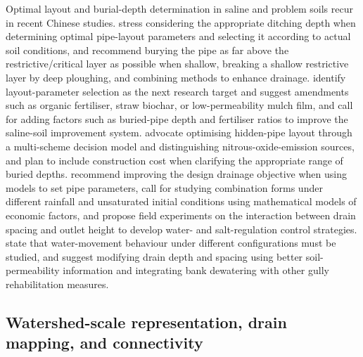 \documentclass[11pt]{article}
\begin{document}
Optimal layout and burial-depth determination in saline and problem soils
recur in recent Chinese studies. \textcite{Tian2023} stress considering the
appropriate ditching depth when determining optimal pipe-layout parameters and
selecting it according to actual soil conditions, and \textcite{Tian2024}
recommend burying the pipe as far above the restrictive/critical layer as
possible when shallow, breaking a shallow restrictive layer by deep ploughing,
and combining methods to enhance drainage. \textcite{Tian2023c} identify
layout-parameter selection as the next research target and suggest amendments
such as organic fertiliser, straw biochar, or low-permeability mulch film, and
\textcite{Zhang2024d} call for adding factors such as buried-pipe depth and
fertiliser ratios to improve the saline-soil improvement system.
\textcite{Zhai2023} advocate optimising hidden-pipe layout through a
multi-scheme decision model and distinguishing nitrous-oxide-emission sources,
and \textcite{Han2023} plan to include construction cost when clarifying the
appropriate range of buried depths. \textcite{Qian2025b} recommend improving
the design drainage objective when using models to set pipe parameters,
\textcite{Ren2021} call for studying combination forms under different rainfall
and unsaturated initial conditions using mathematical models of economic
factors, and \textcite{Zheng2025} propose field experiments on the interaction
between drain spacing and outlet height to develop water- and salt-regulation
control strategies. \textcite{SerranoCoronel2018} state that water-movement
behaviour under different configurations must be studied, and
\textcite{Zegeye2021} suggest modifying drain depth and spacing using better
soil-permeability information and integrating bank dewatering with other gully
rehabilitation measures.

\subsection{Watershed-scale representation, drain mapping, and connectivity}
\end{document}

